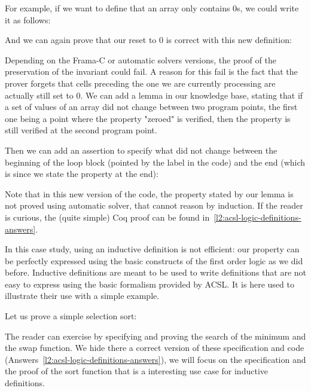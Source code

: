 For example, if we want to define that an array only contains 0s, we could
write it as follows:




And we can again prove that our reset to 0 is correct with this new
definition:


Depending on the Frama-C or automatic solvers versions, the proof of the
preservation of the invariant could fail. A reason for this fail is the fact that
the prover forgets that cells preceding the one we are currently processing
are actually still set to 0. We can add a lemma in our knowledge base, stating
that if a set of values of an array did not change between two program points,
the first one being a point where the property "zeroed" is verified, then the
property is still verified at the second program point.




Then we can add an assertion to specify what did not change between the
beginning of the loop block (pointed by the label  in the code)
and the end (which is  since we state the property at the end):




Note that in this new version of the code, the property stated by our lemma is
not proved using automatic solver, that cannot reason by induction. If the
reader is curious, the (quite simple) Coq proof can be found
in~\ref{l2:acsl-logic-definitions-answers}.


In this case study, using an inductive definition is not efficient: our
property can be perfectly expressed using the basic constructs of the first
order logic as we did before. Inductive definitions are meant to be used to
write definitions that are not easy to express using the basic formalism
provided by ACSL. It is here used to illustrate their use with a simple
example.



\label{l3:acsl-logic-definitions-inductive-sort}


Let us prove a simple selection sort:




The reader can exercise by specifying and proving the search of the minimum and
the swap function. We hide there a correct version of these specification and
code (Answers~\ref{l2:acsl-logic-definitions-answers}), we will focus on the
specification and the proof of the sort function that is a interesting use case
for inductive definitions.


